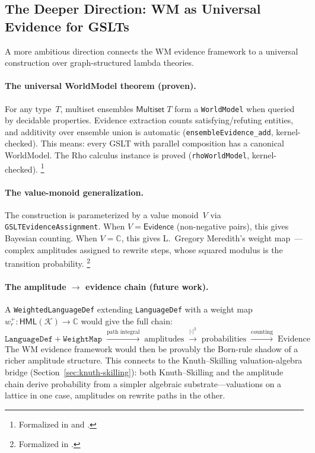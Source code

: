 \documentclass[11pt,openany]{report}
\begin{document}
\subsection{The Deeper Direction: WM as Universal Evidence for GSLTs}

A more ambitious direction connects the WM evidence framework to a
universal construction over graph-structured lambda theories.

\paragraph{The universal WorldModel theorem (proven).}
For any type~$T$, multiset ensembles $\mathsf{Multiset}\;T$ form
a \texttt{WorldModel} when queried by decidable properties.  Evidence
extraction counts satisfying/refuting entities, and additivity over
ensemble union is automatic (\texttt{ensembleEvidence\_add},
kernel-checked).  This means: every GSLT with parallel composition
has a canonical WorldModel.  The Rho calculus instance is proved
(\texttt{rhoWorldModel}, kernel-checked).%
\footnote{Formalized in 
  and .}

\paragraph{The value-monoid generalization.}
The construction is parameterized by a value monoid~$V$ via
\texttt{GSLTEvidenceAssignment}.  When $V = \mathsf{Evidence}$
(non-negative pairs), this gives Bayesian counting.  When
$V = \mathbb{C}$, this gives L.~Gregory Meredith's weight
map~\cite{Meredith2026CCCPractical}---complex amplitudes assigned to
rewrite steps, whose squared modulus is the transition probability.%
\footnote{Formalized in .}

\paragraph{The amplitude $\to$ evidence chain (future work).}
A \texttt{WeightedLanguageDef} extending \texttt{LanguageDef} with a
weight map $w_r^+ : \mathsf{HML}(\mathcal{K}) \to \mathbb{C}$
would give the full chain:
\[
  \texttt{LanguageDef} + \texttt{WeightMap}
  \;\xrightarrow{\text{path integral}}\;
  \text{amplitudes}
  \;\xrightarrow{|\cdot|^2}\;
  \text{probabilities}
  \;\xrightarrow{\text{counting}}\;
  \text{Evidence}
\]
The WM evidence framework would then be provably the Born-rule
shadow of a richer amplitude structure.  This connects to the
Knuth--Skilling valuation-algebra bridge
(Section~\ref{sec:knuth-skilling}): both Knuth--Skilling and the
amplitude chain derive probability from a simpler algebraic
substrate---valuations on a lattice in one case, amplitudes on
rewrite paths in the other.
\end{document}

